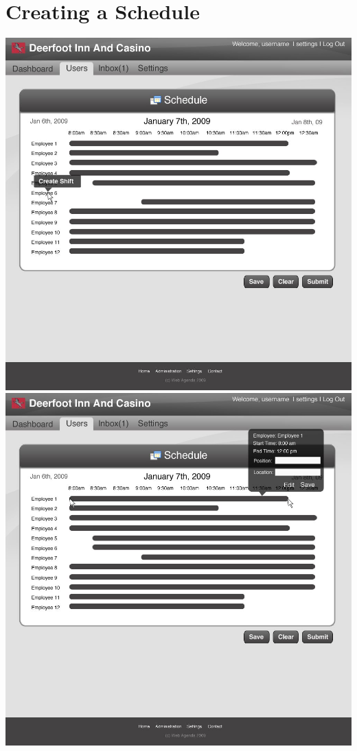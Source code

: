 \documentclass[letterpaper,12pt]{report}
\begin{document}
\section{Creating a Schedule}
\begin{landscape}
\begin{center}
 \includegraphics[scale=0.3]{prototypes/createScheduleClickEmp.jpg}
 \includegraphics[scale=0.3]{prototypes/createSchedDrag.jpg}
\end{center}


\end{landscape}
\end{document}
